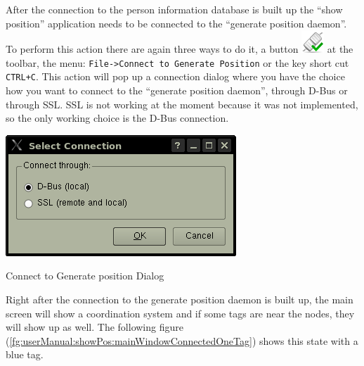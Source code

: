   After the connection to the person information database is built up the ``show position'' application needs to be connected to the ``generate position daemon''. To perform this action there are again three ways to do it, a button \includegraphics[scale=0.15]{images/UserManual/showPos/icons/connect.png} at the toolbar, the menu: \texttt{File->Connect to Generate Position} or the key short cut \texttt{CTRL+C}. This action will pop up a connection dialog where you have the choice how you want to connect to the ``generate position daemon'', through D-Bus or through SSL. SSL is not working at the moment because it was not implemented, so the only working choice is the D-Bus connection.
  \begin{staticFigure}
   \begin{center}
     \includegraphics{images/UserManual/showPos/connect2GenPos.png}
     \caption{Connect to Generate position Dialog}
     \label{fg:userManual:showPos:connect2GenPos}
   \end{center}
  \end{staticFigure}

  Right after the connection to the generate position daemon is built up, the main screen will show a coordination system and if some tags are near the nodes, they will show up as well. The following figure (\ref{fg:userManual:showPos:mainWindowConnectedOneTag}) shows this state with a blue tag.

